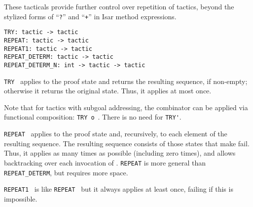 \begin{isabellebody}
\begin{isamarkuptext}
\begin{description}
  \end{description}%
\end{isamarkuptext}%
\isamarkuptrue%
%
\endisatagmlref
{\isafoldmlref}%
%
\isadelimmlref
%
\endisadelimmlref
%
\isamarkuptrue%
%
\begin{isamarkuptext}%
These tacticals provide further control over repetition of
  tactics, beyond the stylized forms of ``\verb|?|''  and
  ``\verb|+|'' in Isar method expressions.%
\end{isamarkuptext}%
\isamarkuptrue%
%
\isadelimmlref
%
\endisadelimmlref
%
\isatagmlref
%
\begin{isamarkuptext}%
\begin{mldecls}
  \verb|TRY: tactic -> tactic| \\
  \verb|REPEAT: tactic -> tactic| \\
  \verb|REPEAT1: tactic -> tactic| \\
  \verb|REPEAT_DETERM: tactic -> tactic| \\
  \verb|REPEAT_DETERM_N: int -> tactic -> tactic| \\
  \end{mldecls}

  \begin{description}

  \item \verb|TRY|~ applies  to the proof
  state and returns the resulting sequence, if non-empty; otherwise it
  returns the original state.  Thus, it applies  at most
  once.

  Note that for tactics with subgoal addressing, the combinator can be
  applied via functional composition: \verb|TRY|~\verb|o|~.  There is no need for \verb|TRY'|.

  \item \verb|REPEAT|~ applies  to the proof
  state and, recursively, to each element of the resulting sequence.
  The resulting sequence consists of those states that make  fail.  Thus, it applies  as many times as
  possible (including zero times), and allows backtracking over each
  invocation of .  \verb|REPEAT| is more general than \verb|REPEAT_DETERM|, but requires more space.

  \item \verb|REPEAT1|~ is like \verb|REPEAT|~
  but it always applies  at least once, failing if this
  is impossible.


\end{description}
\end{isamarkuptext}
\end{isabellebody}
